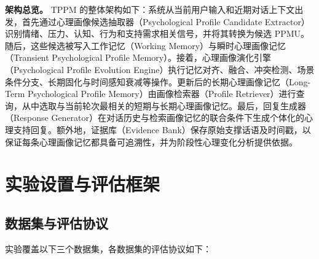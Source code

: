 \documentclass[12pt,a4paper]{article}
\newcommand{\methodname}{\textsc{TPPM}}
\begin{document}
\textbf{架构总览。} \methodname{} 的整体架构如下：系统从当前用户输入和近期对话上下文出发，首先通过心理画像候选抽取器（Psychological Profile Candidate Extractor）识别情绪、压力、认知、行为和支持需求相关信号，并将其转换为候选 PPMU。随后，这些候选被写入工作记忆（Working Memory）与瞬时心理画像记忆（Transient Psychological Profile Memory）。接着，心理画像演化引擎（Psychological Profile Evolution Engine）执行记忆对齐、融合、冲突检测、场景条件分支、长期固化与时间感知衰减等操作。更新后的长期心理画像记忆（Long-Term Psychological Profile Memory）由画像检索器（Profile Retriever）进行查询，从中选取与当前轮次最相关的短期与长期心理画像记忆。最后，回复生成器（Response Generator）在对话历史与检索画像记忆的联合条件下生成个体化的心理支持回复。额外地，证据库（Evidence Bank）保存原始支撑话语及时间戳，以保证每条心理画像记忆都具备可追溯性，并为阶段性心理变化分析提供依据。

\section{实验设置与评估框架}
\label{sec:setup}

\subsection{数据集与评估协议}

实验覆盖以下三个数据集，各数据集的评估协议如下：
\end{document}
